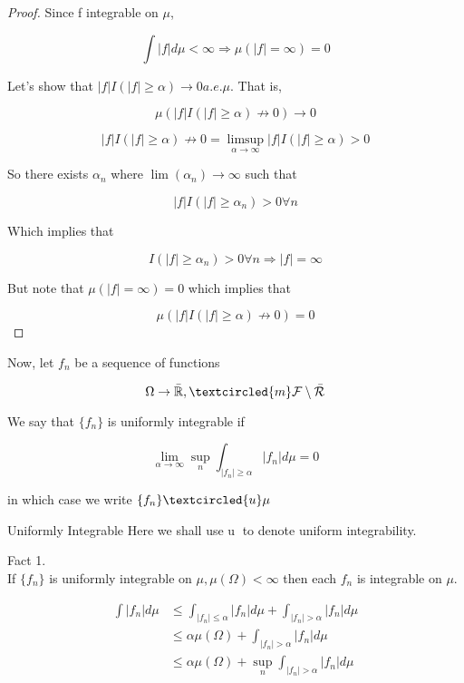 \documentclass[11pt,fleqn]{book} %
\begin{document}
		\begin{proof}
			Since f integrable on $\mu$, 

					$$\int |f| d\mu < \infty \Rightarrow \mu(|f| = \infty) = 0 $$

			Let's show that $|f| I(|f| \geq \alpha) \rightarrow 0 a.e. \mu$. That is, 

					$$\mu(|f| I(|f| \geq \alpha)\not\rightarrow 0) \rightarrow 0 $$

					$$|f| I (|f| \geq \alpha) \not \rightarrow 0 = \limsup_{\alpha \rightarrow \infty} |f| I(|f| \geq \alpha) > 0 $$

			So there exists $\alpha_n$ where $\lim (\alpha_n) \rightarrow \infty$ such that

					$$|f| I(|f| \geq \alpha_n) > 0 \forall n $$

			Which implies that

					$$I(|f| \geq \alpha_n) > 0 \forall n \Rightarrow |f| = \infty $$

			But note that $\mu(|f| = \infty) = 0$ which implies that 

					$$\mu(|f| I (|f| \geq \alpha) \not \rightarrow 0) = 0 $$

		\end{proof}

Now, let $f_n$ be a sequence of functions

		$$\Omega \rightarrow \bar{\mathbb{R}}, \textcircled{m} \mathcal{F}\setminus\bar{\mathcal{R}} $$

We say that $\{f_n\}$ is uniformly integrable if

		$$\lim_{\alpha \rightarrow \infty} \sup_n \int_{|f_n| \geq \alpha} |f_n| d\mu = 0 $$

in which case we write $\{f_n\}  \textcircled{u} \mu$


\begin{notation}{Uniformly Integrable}
	Here we shall use \textcircled{u} to denote uniform integrability. 
\end{notation}

Fact 1. \\

If $\{f_n \}$ is uniformly integrable on $\mu, \mu(\Omega) < \infty$ then each $f_n$ is integrable on $\mu$. 

		\begin{align*}
			\int |f_n| d\mu &\leq \int_{|f_n| \leq \alpha} |f_n| d\mu + \int_{|f_n| > \alpha}|f_n| d\mu \\
					&\leq \alpha \mu(\Omega) + \int_{|f_n| > \alpha}|f_n| d\mu \\
					&\leq \alpha \mu(\Omega) + \sup_{n} \int_{|f_n| > \alpha}|f_n| d\mu \\
		\end{align*}
\end{document}
